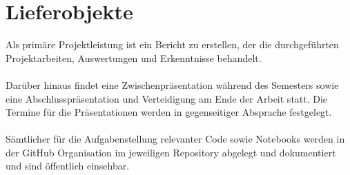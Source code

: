 \section{Lieferobjekte}
Als primäre Projektleistung ist ein Bericht zu erstellen, der die durchgeführten Projektarbeiten, Auswertungen und Erkenntnisse behandelt. \\\\
Darüber hinaus findet eine Zwischenpräsentation während des Semesters sowie eine Abschlusspräsentation und Verteidigung am Ende der Arbeit statt. Die Termine für die Präsentationen werden in gegenseitiger Absprache festgelegt. \\\\
Sämtlicher für die Aufgabenstellung relevanter Code sowie Notebooks werden in der GitHub Organisation im jeweiligen Repository abgelegt und dokumentiert und sind öffentlich einsehbar.


